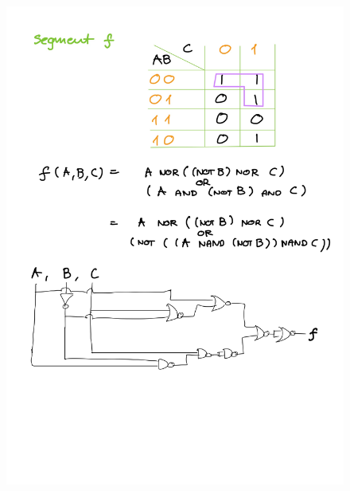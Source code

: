\documentclass[14pt, table]{extarticle}
\begin{document}
\begin{figure}[H]
\includegraphics[scale=0.2]{Elektronika-26}
\centering
\captionsetup{labelformat=empty}
\caption{}
\end{figure}
\end{document}
